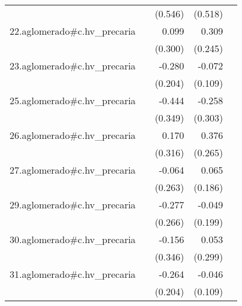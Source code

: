 {\begin{longtable}{l*{4}{D{.}{.}{-1}}}
            &                     &     (0.546)         &     (0.518)         &                     \\
\addlinespace
22.aglomerado#c.hv\_precaria&                     &       0.099         &       0.309         &                     \\
            &                     &     (0.300)         &     (0.245)         &                     \\
\addlinespace
23.aglomerado#c.hv\_precaria&                     &      -0.280         &      -0.072         &                     \\
            &                     &     (0.204)         &     (0.109)         &                     \\
\addlinespace
25.aglomerado#c.hv\_precaria&                     &      -0.444         &      -0.258         &                     \\
            &                     &     (0.349)         &     (0.303)         &                     \\
\addlinespace
26.aglomerado#c.hv\_precaria&                     &       0.170         &       0.376         &                     \\
            &                     &     (0.316)         &     (0.265)         &                     \\
\addlinespace
27.aglomerado#c.hv\_precaria&                     &      -0.064         &       0.065         &                     \\
            &                     &     (0.263)         &     (0.186)         &                     \\
\addlinespace
29.aglomerado#c.hv\_precaria&                     &      -0.277         &      -0.049         &                     \\
            &                     &     (0.266)         &     (0.199)         &                     \\
\addlinespace
30.aglomerado#c.hv\_precaria&                     &      -0.156         &       0.053         &                     \\
            &                     &     (0.346)         &     (0.299)         &                     \\
\addlinespace
31.aglomerado#c.hv\_precaria&                     &      -0.264         &      -0.046         &                     \\
            &                     &     (0.204)         &     (0.109)         &                     \\

\end{longtable}}
